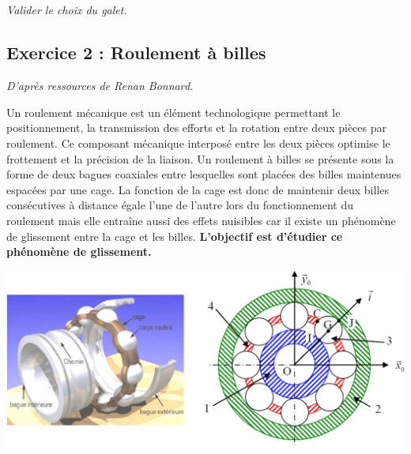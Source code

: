 \documentclass[10pt,oneside]{article}
\begin{document}
\subparagraph{}
\textit{Valider le choix du galet.}




\setcounter{subparagraph}{0}
\subsection*{Exercice 2 : Roulement à billes}
\begin{flushleft}
\textit{D'après ressources de Renan Bonnard.}
\end{flushleft}

Un roulement mécanique est un élément technologique permettant le positionnement, la transmission des efforts et la rotation entre deux pièces par roulement. Ce composant mécanique interposé entre les deux pièces optimise le frottement et la précision de la liaison. Un roulement à billes se présente sous la forme de deux bagues coaxiales entre lesquelles sont placées des billes maintenues espacées par une cage. La fonction de la cage est donc de maintenir deux billes consécutives à distance égale l'une de l'autre lors du fonctionnement du roulement mais elle entraîne aussi des effets nuisibles car il existe un phénomène de glissement entre la cage et les billes. \textbf {L'objectif est d'étudier ce phénomène de glissement.}

\begin{center}
 \includegraphics[width=.6\textwidth]{png/roulement}
\end{center}
\end{document}
